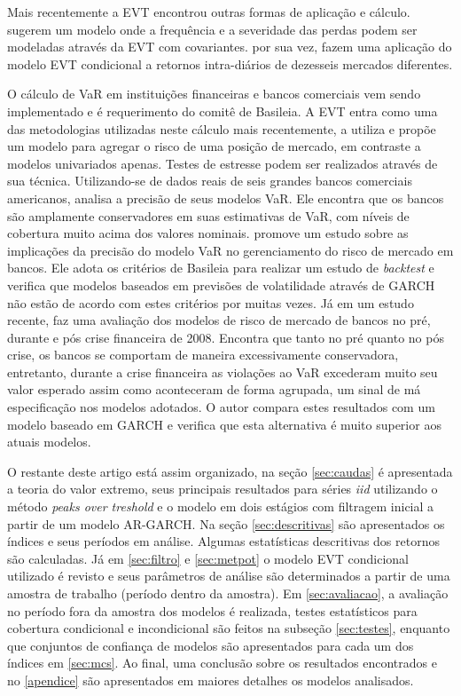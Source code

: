 \documentclass[review]{elsarticle}
\theoremstyle{definition}
\begin{document}
Mais recentemente a EVT encontrou outras formas de aplicação e cálculo. \cite{Chavez-Demoulin2016} sugerem um modelo onde a frequência e a severidade das perdas podem ser modeladas através da EVT com covariantes.  \cite{Karmakar2016} por sua vez, fazem uma aplicação do modelo EVT condicional a retornos intra-diários de dezesseis mercados diferentes.

O cálculo de VaR em instituições financeiras e bancos comerciais vem sendo implementado e é requerimento do comitê de Basileia. A EVT entra como uma das metodologias utilizadas neste cálculo mais recentemente,  \cite{Longin2000} a utiliza e propõe um modelo para agregar o risco de uma posição de mercado, em contraste a modelos univariados apenas. Testes de estresse podem ser realizados através de sua técnica. Utilizando-se de dados reais de seis grandes bancos comerciais americanos, \cite{Berkowitz2002} analisa a precisão de seus modelos VaR. Ele encontra que os bancos são amplamente conservadores em suas estimativas de VaR, com níveis de cobertura muito acima dos valores nominais. \cite{Wong2003} promove um estudo sobre as implicações da precisão do modelo VaR no gerenciamento do risco de mercado em bancos. Ele adota os critérios de Basileia para realizar um estudo de \emph{backtest} e verifica que modelos baseados em previsões de volatilidade através de GARCH não estão de acordo com estes critérios por muitas vezes. Já em um estudo recente, \cite{OBrien2017} faz uma avaliação dos modelos de risco de mercado de bancos no pré, durante e pós crise financeira de 2008. Encontra que tanto no pré quanto no pós crise, os bancos se comportam de maneira excessivamente conservadora, entretanto, durante a crise financeira as violações ao VaR excederam muito seu valor esperado assim como aconteceram de forma agrupada, um sinal de má especificação nos modelos adotados. O autor compara estes resultados com um modelo baseado em GARCH e verifica que esta alternativa é muito superior aos atuais modelos.

O restante deste artigo está assim organizado, na seção \ref{sec:caudas} é apresentada a teoria do valor extremo, seus principais resultados para séries \emph{iid} utilizando o método \emph{peaks over treshold} e o modelo em dois estágios com filtragem inicial a partir de um modelo AR-GARCH. Na seção \ref{sec:descritivas} são apresentados os índices e seus períodos em análise. Algumas estatísticas descritivas dos retornos são calculadas. Já em \ref{sec:filtro} e \ref{sec:metpot} o modelo EVT condicional utilizado é revisto e seus parâmetros de análise são determinados a partir de uma amostra de trabalho (período dentro da amostra). Em \ref{sec:avaliacao}, a avaliação no período fora da amostra dos modelos é realizada, testes estatísticos para cobertura condicional e incondicional são feitos na subseção \ref{sec:testes}, enquanto que conjuntos de confiança de modelos são apresentados para cada um dos índices em \ref{sec:mcs}. Ao final, uma conclusão sobre os resultados encontrados e no \ref{apendice} são apresentados em maiores detalhes os modelos analisados.
\end{document}
